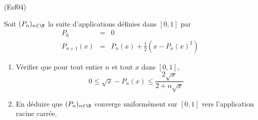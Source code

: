 \begin{tiny}(Esf04)\end{tiny} Soit $(P_n)_{n\in\N}$ la suite d'applications
  d{\'e}finies dans $[0,1]$ par
  \begin{eqnarray*}
  P_0 &=& 0\\
  P_{n+1}(x) &=& P_n(x)+\frac{1}{2}(x-P_n(x)^2)
  \end{eqnarray*}
     \begin{enumerate}
       \item V{\'e}rifier que pour tout entier $n$ et tout $x$ dans
       $[0,1]$,
       \[0\leq \sqrt{x}-P_n(x)\leq \frac{2\sqrt{x}}{2+n\sqrt{x}}\]
       \item En d{\'e}duire que $(P_n)_{n\in\N}$ converge uniform{\'e}ment sur $[0,1]$ vers l'application racine carr{\'e}e.
     \end{enumerate}
